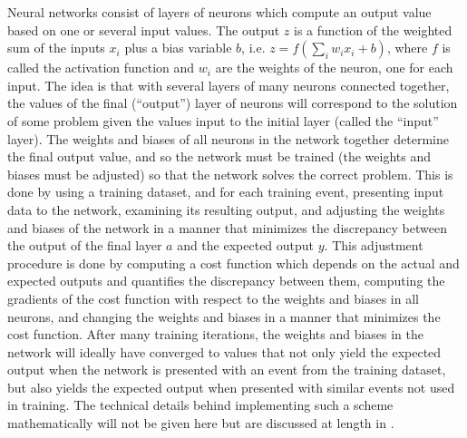 \documentclass[a4paper,11pt]{article}
\begin{document}
Neural networks consist of layers of neurons which compute an output value based on one or several input values.  The output $z$ is a function of the weighted sum of the inputs $x_{i}$ plus a bias variable $b$, i.e. $z = f(\sum_{i}w_{i}x_{i} + b)$, where $f$ is called the activation function and $w_{i}$ are the weights of the neuron, one for each input.  The idea is that
with several layers of many neurons connected together, the values of the final (``output'') layer of neurons will correspond to the solution of some problem given the values input to the
initial layer (called the ``input'' layer).  The weights and biases of all neurons in the network together determine the final output value, and so the network must be trained (the weights and
biases must be adjusted) so that the network solves the correct problem.  This is done by using a training dataset, and for each training event, presenting input data to the network, 
examining its resulting output, and adjusting the weights and biases of the network in a manner that minimizes the discrepancy between the output of the final layer $a$ and the expected 
output $y$.  This adjustment procedure is done by computing a cost function which depends on the actual and expected outputs and quantifies the discrepancy between them, computing 
the gradients of the cost function with respect to the weights and biases in all neurons, and changing the weights and biases in a manner that minimizes the cost function.  After many training
iterations, the weights and biases in the network will ideally have converged to values that not only yield the expected output when the network is presented with an event from the training
dataset, but also yields the expected output when presented with similar events not used in training.  The technical
details behind implementing such a scheme mathematically will not be given here but are discussed at length in \cite{Nielsen_2016}.
\end{document}
